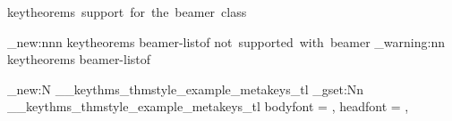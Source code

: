   {keytheorems~support~for~the~beamer~class}

\msg_new:nnn { keytheorems } { beamer-listof }
  {
    \protect\listofkeytheorems\space not~supported~with~beamer
  }
\RenewDocumentCommand {}
  {
    \msg_warning:nn { keytheorems } { beamer-listof }
  }


\tl_new:N \g__keythms_thmstyle_example_metakeys_tl
\tl_gset:Nn \g__keythms_thmstyle_example_metakeys_tl
  {
    bodyfont = \normalfont,
    headfont = \def\inserttheoremblockenv{exampleblock},
  }

